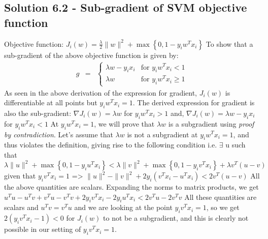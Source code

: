 \documentclass{article}
\begin{document}
    \subsection{Solution 6.2 - Sub-gradient of SVM objective function}
    Objective function:
    $J_{i}(w)=\frac{\lambda}{2}\|w\|^{2}+\max\left\{ 0,1-y_{i}w^{T}x_{i}\right\}$
    \newline
    \newline
    To show that a sub-gradient of the above objective function is given by:
    \newline
    \begin{eqnarray*}
    g & = & \begin{cases}
    \lambda w-y_{i}x_{i} & \mbox {for }y_{i}w^{T}x_{i}<1\\
    \lambda w & \mbox{for }y_{i}w^{T}x_{i} \ge 1
    \end{cases}
    \end{eqnarray*}
    \newline
    \newline
    As seen in the above derivation of the expression for gradient, $J_{i}(w)$ is differentiable at all points but $y_{i}w^{T}x_{i} = 1$. The derived expression for gradient is also the sub-gradient:
    \newline
    \newline
    $\nabla J_{i}(w) = \lambda w$ for $y_{i}w^{T}x_{i} > 1$
    \newline
    and, $\nabla J_{i}(w) = \lambda w - y_{i}x_{i}$ for $y_{i}w^{T}x_{i} < 1$
    \newline
    \newline
    At $y_{i}w^{T}x_{i} = 1$, we will prove that $\lambda w$ is a subgradient using \textit{proof by contradiction}. Let's assume that $\lambda w$ is not a subgradient at $y_{i}w^{T}x_{i} = 1$, and thus violates the definition, giving rise to the following condition
    \newline
    \newline
    i.e. $\exists$ u such that
    \newline
    \newline
    $\lambda\|u\|^{2} + \max\left\{ 0,1-y_{i}u^{T}x_{i}\right\} < \lambda\|v\|^{2} + \max\left\{ 0,1-y_{i}v^{T}x_{i}\right\} + \lambda v^{T}(u - v)$ given that $y_{i}v^{T}x_{i} = 1$
    \newline => $\|u\|^{2} - \|v\|^{2} + 2y_{i}(v^{T}x_{i} - u^{T}x_{i}) < 2v^{T}(u - v)$
    \newline
    \newline
    All the above quantities are scalars. Expanding the norms to matrix products, we get
    \newline
    $u^{T}u - u^{T}v + v^{T}u - v^{T}v + 2y_{i}v^{T}x_{i} - 2y_{i}u^{T}x_{i} < 2v^{T}u - 2v^{T}v$
    \newline
    \newline
    All these quantities are scalars and $u^{T}v = v^{T}u$ and we are looking at the point $y_{i}v^{T}x_{i} = 1$, so we get
    \newline
    \newline
    $2 (y_{i}v^{T}x_{i} - 1) < 0$ for $J_{i}(w)$ to not be a subgradient, and this is clearly not possible in our setting of $y_{i}v^{T}x_{i} = 1$.
    
\end{document}
